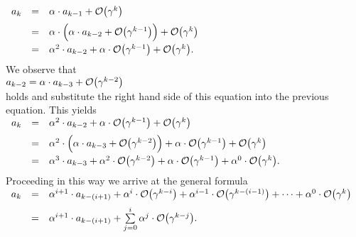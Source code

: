 \\[0.2cm]
\hspace*{1.3cm}
$
\begin{array}[t]{lcl}
  a_k & = & \alpha \cdot a_{k-1} + \mathcal{O}\bigl(\gamma^k\bigr)  \\[0.2cm]
      & = & \alpha \cdot \Bigl(\alpha \cdot a_{k-2} + \mathcal{O}\bigl(\gamma^{k-1}\bigr)\Bigr) + \mathcal{O}\bigl(\gamma^k\bigr) \\[0.2cm]
      & = & \alpha^2 \cdot a_{k-2} + \alpha \cdot \mathcal{O}\bigl(\gamma^{k-1}\bigr) + \mathcal{O}\bigl(\gamma^k\bigr). \\[0.2cm]
\end{array}
$
\\[0.2cm]
We observe that 
\\[0.2cm]
\hspace*{1.3cm}
$a_{k-2} = \alpha \cdot a_{k-3} + \mathcal{O}\bigl(\gamma^{k-2}\bigr)$
\\[0.2cm]
holds and substitute the right hand side of this equation into the previous equation.  This yields
\\[0.2cm]
\hspace*{1.3cm}
$
\begin{array}[t]{lcl}
  a_k & = & \alpha^2 \cdot a_{k-2} + \alpha \cdot \mathcal{O}\bigl(\gamma^{k-1}\bigr) + \mathcal{O}\bigl(\gamma^k\bigr) \\[0.2cm]
      & = & \alpha^2 \cdot \Bigl(\alpha \cdot a_{k-3} + \mathcal{O}\bigl(\gamma^{k-2}\bigr)\Bigr) + \alpha \cdot \mathcal{O}\bigl(\gamma^{k-1}\bigr) + \mathcal{O}\bigl(\gamma^k\bigr) \\[0.2cm]
      & = & \alpha^3 \cdot a_{k-3} + \alpha^2 \cdot \mathcal{O}\bigl(\gamma^{k-2}\bigr) + \alpha \cdot \mathcal{O}\bigl(\gamma^{k-1}\bigr) + \alpha^0 \cdot \mathcal{O}\bigl(\gamma^k\bigr). \\[0.2cm]
\end{array}
$
\\[0.2cm]
Proceeding in this way we arrive at the general formula
\\[0.2cm]
\hspace*{1.3cm}
$
\begin{array}[b]{lcl}
a_k & = & \alpha^{i+1} \cdot a_{k-(i+1)} + \alpha^{i} \cdot \mathcal{O}\bigl(\gamma^{k-i}\bigr) + \alpha^{i-1} \cdot \mathcal{O}\bigl(\gamma^{k-(i-1)}\bigr) + \cdots + \alpha^0 \cdot \mathcal{O}\bigl(\gamma^k\bigr) \\[0.2cm]
    & = & \alpha^{i+1} \cdot a_{k-(i+1)} + \sum\limits_{j=0}^i \alpha^{j} \cdot \mathcal{O}\bigl(\gamma^{k-j}\bigr). \\[0.2cm]
\end{array}
$
\\[0.2cm]
